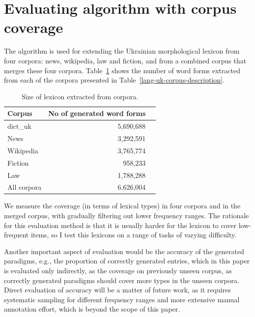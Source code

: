 \documentclass[11pt,a4paper]{article}
\begin{document}
\section{Evaluating algorithm with corpus coverage}
\label{sec:Evaluation}

The algorithm is used for extending the Ukrainian morphological lexicon from four corpora: news, wikipedia, law and fiction, and from a combined corpus that merges these four corpora. Table~\ref{lang-uk-corpus-generation} shows the number of word forms extracted from each of the corpora presented in Table~\ref{lang-uk-corpus-description}.

\begin{table}[]
	\begin{center}
		\begin{tabular}{|l|rr|}
			\hline \textbf{Corpus} & \textbf{No of generated word forms} & \textbf{ } 
			\\ \hline
			dict\_uk & 5,690,688  &  \\
			\hline
			News & 3,292,591 &  \\
			Wikipedia & 3,765,774 &  \\
			Fiction & 958,233 &  \\
			Law & 1,788,288 &  \\
			\hline
			All corpora & 6,626,004 &  \\
			\hline
		\end{tabular}
	\end{center}
	\caption{\label{lang-uk-corpus-generation} Size of lexicon extracted from corpora. }
\end{table}

We measure the coverage (in terms of lexical types) in four corpora and in the merged corpus, with gradually filtering out lower frequency ranges. The rationale for this evaluation method is that it is usually harder for the lexicon to cover low-frequent items, so I test this lexicons on a range of tasks of varying difficulty.


Another important aspect of evaluation would be the accuracy of the generated paradigms, e.g., the proportion of correctly generated entries, which in this paper is evaluated only indirectly, as the coverage on previously unseen corpus, as correctly generated paradigms should cover more types in the unseen corpora. Direct evaluation of accuracy will be a matter of future work, as it requires systematic sampling for different frequency ranges and more extensive manual annotation effort, which is beyond the scope of this paper. 
\end{document}

